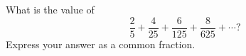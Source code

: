 What is the value of
\[
\dfrac{2}{5}+\dfrac{4}{25}+\dfrac{6}{125}+\dfrac{8}{625}+\cdots ?
\]
Express your answer as a common fraction.
